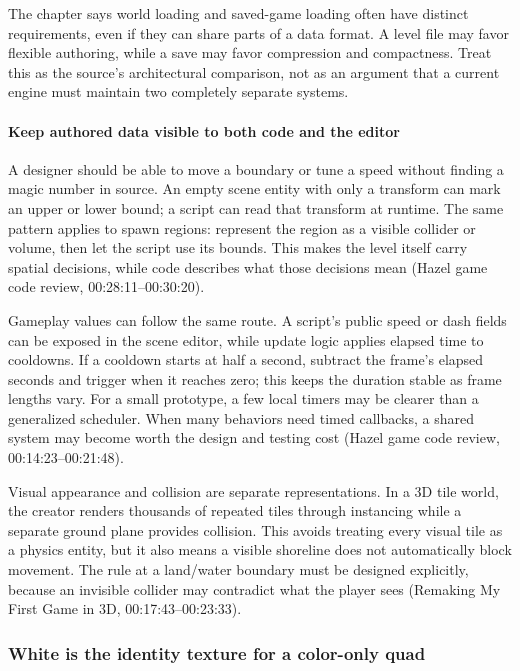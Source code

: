 The chapter says world loading and saved-game loading often have distinct requirements, even if they can share parts of a data format. A level file may favor flexible authoring, while a save may favor compression and compactness. Treat this as the source's architectural comparison, not as an argument that a current engine must maintain two completely separate systems.

\paragraph{Keep authored data visible to both code and the editor}\label{keep-authored-data-visible-to-both-code-and-the-editor}

A designer should be able to move a boundary or tune a speed without finding a magic number in source. An empty scene entity with only a transform can mark an upper or lower bound; a script can read that transform at runtime. The same pattern applies to spawn regions: represent the region as a visible collider or volume, then let the script use its bounds. This makes the level itself carry spatial decisions, while code describes what those decisions mean (Hazel game code review, 00:28:11--00:30:20).

Gameplay values can follow the same route. A script's public speed or dash fields can be exposed in the scene editor, while update logic applies elapsed time to cooldowns. If a cooldown starts at half a second, subtract the frame's elapsed seconds and trigger when it reaches zero; this keeps the duration stable as frame lengths vary. For a small prototype, a few local timers may be clearer than a generalized scheduler. When many behaviors need timed callbacks, a shared system may become worth the design and testing cost (Hazel game code review, 00:14:23--00:21:48).

Visual appearance and collision are separate representations. In a 3D tile world, the creator renders thousands of repeated tiles through instancing while a separate ground plane provides collision. This avoids treating every visual tile as a physics entity, but it also means a visible shoreline does not automatically block movement. The rule at a land/water boundary must be designed explicitly, because an invisible collider may contradict what the player sees (Remaking My First Game in 3D, 00:17:43--00:23:33).

\subsubsection{White is the identity texture for a color-only quad}\label{white-is-the-identity-texture-for-a-color-only-quad}

